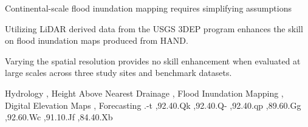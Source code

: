 \documentclass[preprint,review,12pt]{dependencies/elsarticle}
\begin{document}
\begin{frontmatter}
\begin{abstract}
\end{abstract}
%
%
%
%
\begin{highlights}
\item Continental-scale flood inundation mapping requires simplifying assumptions
\item Utilizing LiDAR derived data from the USGS 3DEP program enhances the skill on flood inundation maps produced from \ac{HAND}.
\item Varying the spatial resolution provides no skill enhancement when evaluated at large scales across three study sites and benchmark datasets.
\end{highlights}
%
%
%
\begin{keyword}
Hydrology \sep
Height Above Nearest Drainage \sep
Flood Inundation Mapping \sep
Digital Elevation Maps \sep
Forecasting
%
.-t \sep 92.40.Qk \sep *92.40.Q- \sep *92.40.qp \sep 89.60.Gg \sep 92.60.Wc \sep 91.10.Jf \sep 84.40.Xb
%
%
\end{keyword}
%
\end{frontmatter}
%
%
\linenumbers
%
\end{document}
